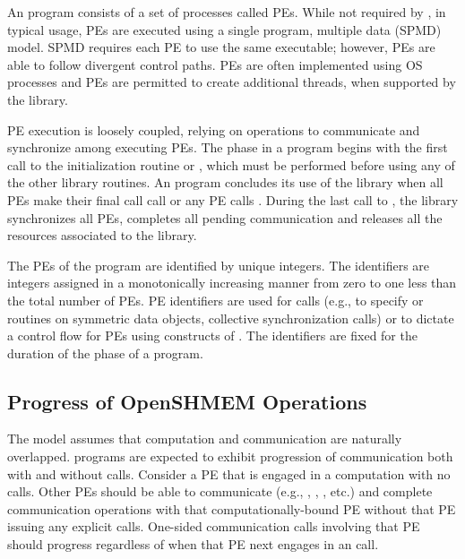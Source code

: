 An \openshmem program consists of a set of \openshmem processes called
\acp{PE}.  While not required by \openshmem, in typical usage, \acp{PE} are
executed using a single program, multiple data (\ac{SPMD}) model.  \ac{SPMD}
requires each \ac{PE} to use the same executable; however, \acp{PE} are able to
follow divergent control paths.  \acp{PE} are often implemented using \ac{OS}
processes and \acp{PE} are permitted to create additional
threads, when supported by the \openshmem library.

\ac{PE} execution is loosely coupled, relying on \openshmem operations to
communicate and synchronize among executing \acp{PE}.  The \openshmem phase in
a program begins with the first call to the initialization routine 
or , which must be performed before using any of the
other \openshmem library routines. 
An \openshmem program concludes its use of the \openshmem library when all \acp{PE}
make their final call call
 or any \ac{PE} calls .
During the last call to , the \openshmem library synchronizes
all \acp{PE}, completes all pending communication and releases all the resources
associated to the library.

The \acp{PE} of the \openshmem program are identified by unique integers.  The
identifiers are integers assigned in a monotonically increasing manner from zero
to one less than the total number of \acp{PE}. \ac{PE} identifiers are used for
\openshmem calls (e.g., to specify  or  routines on symmetric
data objects, collective synchronization calls) or to dictate a control flow for
\acp{PE} using constructs of \Cstd. The identifiers are fixed for
the duration of the \openshmem phase of a program.

\subsection{Progress of OpenSHMEM Operations}\label{subsec:progress}

The \openshmem model assumes that computation and communication are naturally
overlapped. \openshmem programs are expected to exhibit progression of
communication both with and without \openshmem calls. Consider a \ac{PE} that is
engaged in a computation with no \openshmem calls. Other \acp{PE} should be able
to communicate (e.g., , , , etc.) and
complete communication operations with that computationally-bound \ac{PE}
without that \ac{PE} issuing any explicit \openshmem calls. One-sided \openshmem
communication calls involving that \ac{PE} should progress regardless of when
that \ac{PE} next engages in an \openshmem call.

